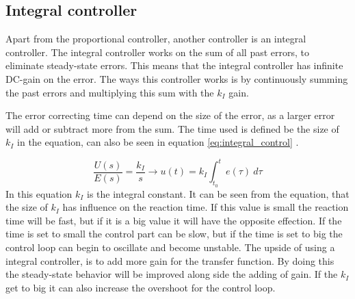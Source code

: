 \subsection*{Integral controller}
Apart from the proportional controller, another controller is an integral controller. The integral controller works on the sum of all past errors, to eliminate steady-state errors. This means that the integral controller has infinite DC-gain on the error. The ways this controller works is by continuously summing the past errors and multiplying this sum with the $k_I$ gain.

The error correcting time can depend on the size of the error, as a larger error will add or subtract more from the sum. The time used is defined be the size of $k_I$ in the equation, can also be seen in equation \ref{eq:integral_control} \cite{digital_control}. 

\begin{equation}\label{eq:integral_control}
    \frac{U(s)}{E(s)}=\frac{k_I}{s} \to u(t)=k_I \int_{t_0}^t e(\tau) \ d\tau
\end{equation}
In this equation $k_I$ is the integral constant. It can be seen from the equation, that the size of $k_I$ has influence on the reaction time. If this value is small the reaction time will be fast, but if it is a big value it will have the opposite effection. If the time is set to small the control part can be slow, but if the time is set to big the control loop can begin to oscillate and become unstable. The upside of using a integral controller, is to add more gain for the transfer function. By doing this the steady-state behavior will be improved along side the adding of gain. 
If the $k_I$ get to big it can also increase the overshoot for the control loop\cite{digital_control}. 


